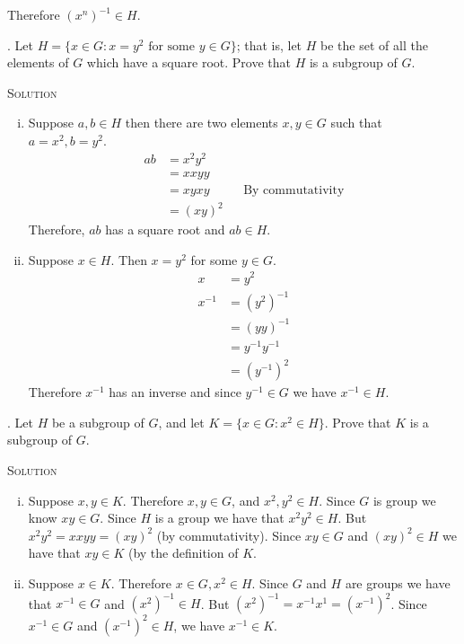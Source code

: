 \documentclass[twoside]{amsart}
\newcommand{\solution}{\textsc{Solution}\xspace}
\begin{document}
\begin{enumerate}[A.]
\begin{enumerate}[(i)]
      Therefore $(x^n)^{-1} \in H$.
   \end{enumerate}

   . Let $H=\{x\in G : x = y^2 \text{ for some } y \in G\}$;
   that is, let $H$ be the set of all the elements of $G$ which
   have a square root. Prove that $H$ is a subgroup of $G$.

   \noindent \solution
   \begin{enumerate}[(i)]
      \item Suppose $a,b \in H$ then there are two elements $x,y\in G$
      such that $a=x^2, b=y^2$. 
      \begin{align*}
         ab & = x^2y^2 \\
	    & = xxyy   \\
	    & = xyxy   && \text{By commutativity} \\
	    & = (xy)^2
      \end{align*}
      Therefore, $ab$ has a square root and $ab \in H$.

      \item Suppose $x \in H$. Then $x=y^2$ for some $y \in G$. 
      \begin{align*}
         x & = y^2 \\
	 x^{-1} & = (y^2)^{-1} \\
	        & = (yy)^{-1} \\
		& = y^{-1}y^{-1} \\
		& = (y^{-1})^2
      \end{align*}
      Therefore $x^{-1}$ has an inverse and since $y^{-1}\in G$ 
      we have $x^{-1} \in H$.
   \end{enumerate}

   . Let $H$ be a subgroup of $G$, and let 
   $K = \{x \in G : x^2 \in H\}$. Prove that $K$ is a subgroup of $G$.

   \noindent \solution 
   \begin{enumerate}[(i)]
      \item Suppose $x,y \in K$. Therefore $x,y\in G$, and $x^2,y^2 \in H$.
      Since $G$ is group we know $xy \in G$. Since $H$ is a group we
      have that $x^2y^2 \in H$. But $x^2y^2 = xxyy = (xy)^2$ (by commutativity).
      Since $xy\in G$ and $(xy)^2 \in H$ we have that $xy \in K$ (by
      the definition of $K$.

      \item Suppose $x \in K$. Therefore $x \in G, x^2 \in H$. Since
      $G$ and $H$ are groups we have that $x^{-1} \in G$ and 
      $(x^2)^{-1} \in H$. But $(x^2)^{-1} = x^{-1}x^{1} = (x^{-1})^2$.
      Since $x^{-1} \in G$ and $(x^{-1})^2 \in H$, we have
      $x^{-1} \in K$.
   \end{enumerate}
   


\end{enumerate}
\end{document}
